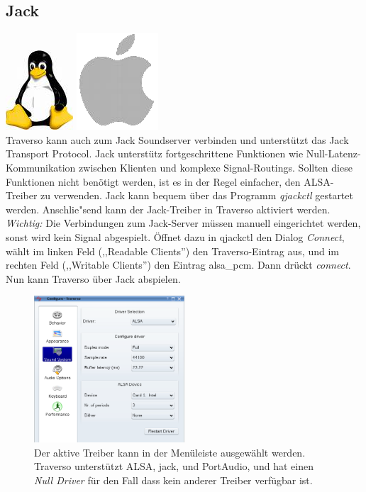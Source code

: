 \subsection{Jack}
\includegraphics[height=\baselineskip]{../images/tux.png}
\includegraphics[height=\baselineskip]{../images/mac.png}
\\
Traverso kann auch zum Jack Soundserver verbinden und unterstützt das Jack Transport Protocol. Jack unterstütz fortgeschrittene Funktionen wie Null-Latenz-Kommunikation zwischen Klienten und komplexe Signal-Routings. Sollten diese Funktionen nicht benötigt werden, ist es in der Regel einfacher, den ALSA-Treiber zu verwenden. Jack kann bequem über das Programm \emph{qjackctl} gestartet werden. Anschlie"send kann der Jack-Treiber in Traverso aktiviert werden. \emph{Wichtig:} Die Verbindungen zum Jack-Server müssen manuell eingerichtet werden, sonst wird kein Signal abgespielt. Öffnet dazu in qjackctl den Dialog \emph{Connect}, wählt im linken Feld (,,Readable Clients'') den Traverso-Eintrag aus, und im rechten Feld (,,Writable Clients'') den Eintrag alsa\_pcm. Dann drückt \emph{connect}. Nun kann Traverso über Jack abspielen.

\begin{figure}
 \centering\includegraphics[width=0.5\textwidth]{../images/sshot02.png}
 \caption{Der aktive Treiber kann in der Menüleiste ausgewählt werden. Traverso unterstützt ALSA, jack, und PortAudio, und hat einen \emph{Null Driver} für den Fall dass kein anderer Treiber verfügbar ist.}
 \label{fig_driverconf}
\end{figure}

